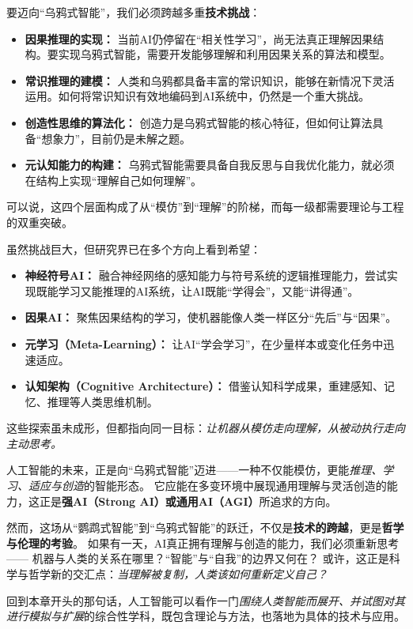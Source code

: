 要迈向“乌鸦式智能”，我们必须跨越多重\textbf{技术挑战}：  
\begin{itemize}
\item \textbf{因果推理的实现：} 当前AI仍停留在“相关性学习”，尚无法真正理解因果结构。要实现乌鸦式智能，需要开发能够理解和利用因果关系的算法和模型。  
\item \textbf{常识推理的建模：} 人类和乌鸦都具备丰富的常识知识，能够在新情况下灵活运用。如何将常识知识有效地编码到AI系统中，仍然是一个重大挑战。  

\item \textbf{创造性思维的算法化：} 创造力是乌鸦式智能的核心特征，但如何让算法具备“想象力”，目前仍是未解之题。  
\item \textbf{元认知能力的构建：} 乌鸦式智能需要具备自我反思与自我优化能力，就必须在结构上实现“理解自己如何理解”。  
\end{itemize}
可以说，这四个层面构成了从“模仿”到“理解”的阶梯，而每一级都需要理论与工程的双重突破。  

虽然挑战巨大，但研究界已在多个方向上看到希望：  
\begin{itemize}
\item \textbf{神经符号AI：} 融合神经网络的感知能力与符号系统的逻辑推理能力，尝试实现既能学习又能推理的AI系统，让AI既能“学得会”，又能“讲得通”。  
\item \textbf{因果AI：} 聚焦因果结构的学习，使机器能像人类一样区分“先后”与“因果”。  
\item \textbf{元学习（Meta-Learning）：} 让AI“学会学习”，在少量样本或变化任务中迅速适应。  
\item \textbf{认知架构（Cognitive Architecture）：} 借鉴认知科学成果，重建感知、记忆、推理等人类思维机制。  
\end{itemize}
这些探索虽未成形，但都指向同一目标：\emph{让机器从模仿走向理解，从被动执行走向主动思考。}  

人工智能的未来，正是向“乌鸦式智能”迈进——一种不仅能模仿，更能\emph{推理、学习、适应与创造}的智能形态。  
它应能在多变环境中展现通用理解与灵活创造的能力，这正是\textbf{强AI（Strong AI）或通用AI（AGI）}所追求的方向。  

然而，这场从“鹦鹉式智能”到“乌鸦式智能”的跃迁，不仅是\textbf{技术的跨越}，更是\textbf{哲学与伦理的考验}。  如果有一天，AI真正拥有理解与创造的能力，我们必须重新思考——  
机器与人类的关系在哪里？“智能”与“自我”的边界又何在？  
或许，这正是科学与哲学新的交汇点：\emph{当理解被复制，人类该如何重新定义自己？}  

回到本章开头的那句话，人工智能可以看作一门\emph{围绕人类智能而展开、并试图对其进行模拟与扩展}的综合性学科，既包含理论与方法，也落地为具体的技术与应用。

